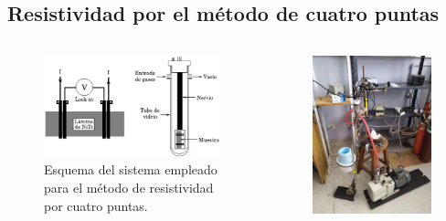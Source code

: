 \documentclass[11pt]{beamer}
\begin{document}
	\subsection{Resistividad por el método de cuatro puntas}
		\begin{frame}
			\begin{columns}
				\begin{column}{.49\textwidth}
					\begin{figure}[H]
						\centering
						\includegraphics[scale=0.3]{img/resistividad.eps}
						\caption*{Esquema del sistema empleado para el método de 								 resistividad por cuatro puntas.}
					\end{figure}
				\end{column}
				\begin{column}{.49\textwidth}
					\begin{figure}[H]
						\centering
						\includegraphics[scale=0.1]{img/resistividad.jpg}

\end{figure}
\end{column}
\end{columns}
\end{frame}
\end{document}
